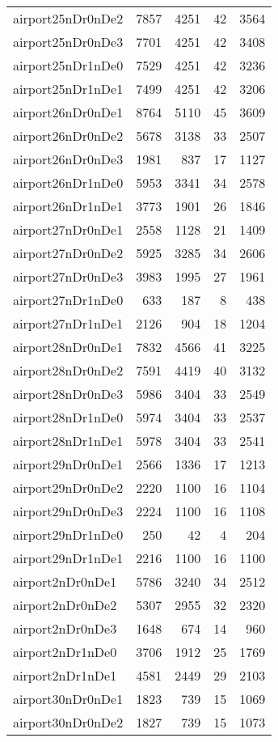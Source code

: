 \begin{longtable}{lrrrr}
airport25nDr0nDe2 & 7857 & 4251 & 42 & 3564 \\
airport25nDr0nDe3 & 7701 & 4251 & 42 & 3408 \\
airport25nDr1nDe0 & 7529 & 4251 & 42 & 3236 \\
airport25nDr1nDe1 & 7499 & 4251 & 42 & 3206 \\
airport26nDr0nDe1 & 8764 & 5110 & 45 & 3609 \\
airport26nDr0nDe2 & 5678 & 3138 & 33 & 2507 \\
airport26nDr0nDe3 & 1981 & 837 & 17 & 1127 \\
airport26nDr1nDe0 & 5953 & 3341 & 34 & 2578 \\
airport26nDr1nDe1 & 3773 & 1901 & 26 & 1846 \\
airport27nDr0nDe1 & 2558 & 1128 & 21 & 1409 \\
airport27nDr0nDe2 & 5925 & 3285 & 34 & 2606 \\
airport27nDr0nDe3 & 3983 & 1995 & 27 & 1961 \\
airport27nDr1nDe0 & 633 & 187 & 8 & 438 \\
airport27nDr1nDe1 & 2126 & 904 & 18 & 1204 \\
airport28nDr0nDe1 & 7832 & 4566 & 41 & 3225 \\
airport28nDr0nDe2 & 7591 & 4419 & 40 & 3132 \\
airport28nDr0nDe3 & 5986 & 3404 & 33 & 2549 \\
airport28nDr1nDe0 & 5974 & 3404 & 33 & 2537 \\
airport28nDr1nDe1 & 5978 & 3404 & 33 & 2541 \\
airport29nDr0nDe1 & 2566 & 1336 & 17 & 1213 \\
airport29nDr0nDe2 & 2220 & 1100 & 16 & 1104 \\
airport29nDr0nDe3 & 2224 & 1100 & 16 & 1108 \\
airport29nDr1nDe0 & 250 & 42 & 4 & 204 \\
airport29nDr1nDe1 & 2216 & 1100 & 16 & 1100 \\
airport2nDr0nDe1 & 5786 & 3240 & 34 & 2512 \\
airport2nDr0nDe2 & 5307 & 2955 & 32 & 2320 \\
airport2nDr0nDe3 & 1648 & 674 & 14 & 960 \\
airport2nDr1nDe0 & 3706 & 1912 & 25 & 1769 \\
airport2nDr1nDe1 & 4581 & 2449 & 29 & 2103 \\
airport30nDr0nDe1 & 1823 & 739 & 15 & 1069 \\
airport30nDr0nDe2 & 1827 & 739 & 15 & 1073 \\

\end{longtable}
